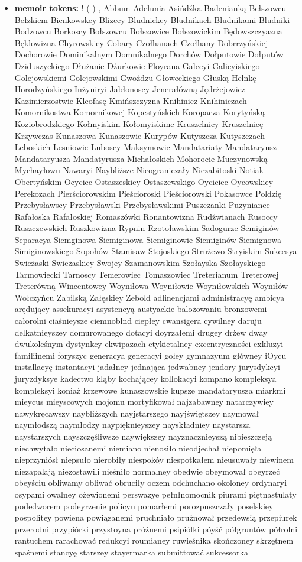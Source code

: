 \begin{itemize}
    \item \textbf{memoir tokens:}  ! ( ) , Abbum Adelunia Asińdźka Badenianką Bełszowcu Bełzkiem Bienkowskey Blizcey Bludnickey Bludnikach Bludnikami Bludniki Bodzowcu Borkoscy Bołszowcu Bołszowice Bołszowickim Będowszczyazna Bęklowizna Chyrowskiey Cobary Czołhanach Czołhany Dobrrzyńskiej Dochorowie Dominikalnym Domnikalnego Dorchów Dołputowie Dołputów Dziduszyckiego Dłużanie Dźurkowie Floyrana Galecyi Galicyiskiego Golejowskiemi Golejowskimi Gwoźdzu Głoweckiego Głuską Helnkę Horodzyńskiego Inżyniryi Jabłonoscy Jenerałówną Jędrżejowicz Kazimierzostwie Kleofasę Kmińszczyzna Knihinicz Knihiniczach Komornikostwa Komornikowej Kopestyńskich Koropacza Korytyńską Koziobrodzkiego Kołmyiskim Kołomyiskimc Kruszelnicy Kruszelnicę Krzywczas Kunaszowa Kunaszowie Kurypów Kutyszcza Kutyszczach Leboskich Lesniowic Luboscy Maksymowic Mandatariaty Mandataryusz Mandataryusza Mandatyrusza Michałoskich Mohorocie Muczynowską Mychayłowu Nawaryi Naybliższe Nieograniczały Niezabitoski Notiak Obertyńskim Ocyciec Ostaszeskiey Ostaszewskigo Oyciciec Oycowskiey Perekozach Pierściorowskim Pieścioroski Pieściorowski Pokasowce Poldzię Przebysławscy Przebysławski Przebysławskimi Puszczanki Puzyniance Rafałoska Rafałoskiej Romaszówki Ronantowizna Rudźwianach Rusoccy Ruszczewskich Ruszkowizna Rypnin Rzotoławskim Sadogurze Semiginów Separacya Siemginowa Siemiginowa Siemiginowie Siemiginów Siemignowa Simiginowskiego Sopohów Stamisaw Stojoskiego Strużewo Stryiskim Sukcesya Swieżaski Swieżaskiey Swojey Szamanowskim Szołayska Szołayskiego Tarmowiecki Tarnoscy Temerowiec Tomaszowiec Treterianum Treterowej Treterówną Wincentowey Woyniłowa Woyniłowie Woyniłowskich Woyniłów Wołczyńcu Zabilską Załęskiey Zebold adlinencjami administracyę ambicya arędujący assekuracyi asystencyą austyackie balożowaniu bronzowemi całorolni ciaśnieysze ciemnoblnd ciepłey cwansigera cywilney daruju delkatnieyszey domurowanego dotacyi doyrzałemi drugey drżew dway dwukoleśnym dystynkcy ekwipazach etykietalney excentryczności exkluzyi familiinemi foryszyc generacya generacyi gołey gymnazyum główney iOycu installacyę instantacyi jadałney jednająca jedwabney jendory jurysdykcyi juryzdyksye kadectwo kląby kochającey kollokacyi kompano kompleksya kompleksyi koniaż krzewowe kunaszowskie kupsze mandataryusza miarkmi mieycus mieyscowych mojomu mortyfikował najzabawney natarczywiey nawykręcawszy naybliższych nayjstarszego nayjświętszey naymował naymłodszą naymłodzy naypięknieyszey nayskładniey naystarsza naystarszych nayszczęśliwsze naywiększey nayznacznieyszą nibieszczeją niechwytało nieciosanemi niemiano nienosiło nieodjechał niepomięła nieprzyniósł niepsuło nierobiły niespokóy niespotkałem nieusuwały niewinem niezapalają niezostawili nieśniło normalney obedwie obeymował obeyrzeć obeyściu obliwamy obliwać obruciły oczem odchuchano okoloney ordynaryi osypami owalney ożewionemi perswazye pełnłnomocnik piurami piętnastulaty podedworem podeyrzenie policyu pomarłemi porozpuszczały poselskiey pospolitey powiena powiązanemi pruchniało prużnował przedewsią przepiurek przerodni przypiórki przystoyna próżnemi psipiólki póyść półgruntów półrolni rantuchem rarachować redukcyi roumianey ruwieśnika skończoney skrzętnem spaśnemi stancyę starszey stayermarka submittować sukcessorka 
\end{itemize}

